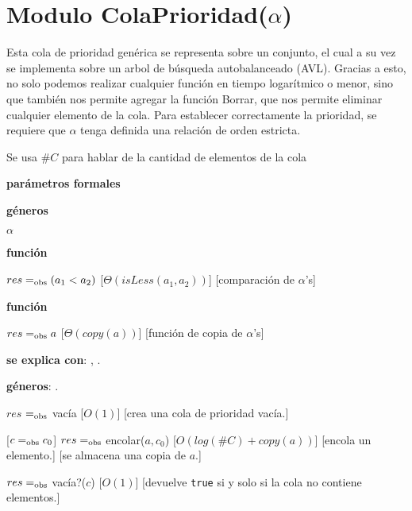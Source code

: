 \section{Modulo ColaPrioridad($\alpha$)}

Esta cola de prioridad genérica se representa sobre un conjunto, el cual a su vez se implementa sobre un arbol de búsqueda autobalanceado (AVL). Gracias a esto, no solo podemos realizar cualquier función en tiempo logarítmico o menor, sino que también nos permite agregar la función Borrar, que nos permite eliminar cualquier elemento de la cola. Para establecer correctamente la prioridad, se requiere que $\alpha$ tenga definida una relación de orden estricta.

Se usa $\#C$ para hablar de la cantidad de elementos de la cola

\begin{Interfaz}

	\textbf{parámetros formales}\parindent\\
	\parbox{1.7cm}{\textbf{géneros}}$\alpha$\\
	\parbox[t]{1.7cm}{\textbf{función}}\parbox[t]{.5\textwidth-\parindent-1.7cm}{
		{$res =_{\mathrm{obs}} (a_1 < a_2)$}
		[$\Theta(isLess(a_1, a_2))$]
		[comparación de $\alpha$'s]
	}
	\parbox[t]{1.7cm}{\textbf{función}}\parbox[t]{.5\textwidth-\parindent-1.7cm}{
		{$res =_{\mathrm{obs}} a$}
		[$\Theta(copy(a))$]
		[función de copia de $\alpha$'s]
	}

	\textbf{se explica con}: , .

	\textbf{géneros}: .


	{$res$ $=_{\mathrm{obs}}$ vacía}
	[$O(1)$]
	[crea una cola de prioridad vacía.]

	[$c =_{\mathrm{obs}} c_0$]
	{$res =_{\mathrm{obs}}$ encolar($a, c_0$)}
	[$O(log(\#C) + copy(a))$]
	[encola un elemento.]
	[se almacena una copia de $a$.]

	{$res =_{\mathrm{obs}}$ vacía?($c$)}
	[$O(1)$]
	[devuelve \texttt{true} si y solo si la cola no contiene elementos.]


\end{Interfaz}

